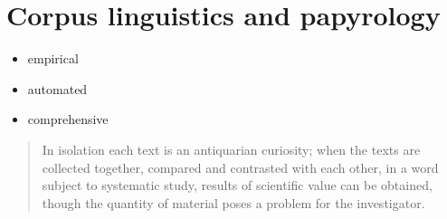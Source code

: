 \chapter{Corpus linguistics and papyrology}
\label{chp:corpuspapyrology}
\minitoc\mtcskip

\begin{itemize}
\item empirical
\item automated
\item comprehensive
\end{itemize}
\begin{quote}
In isolation each text is an antiquarian curiosity; when the texts are
collected together, compared and contrasted with each other, in a word subject
to systematic study, results of scientific value can be obtained, though the
quantity of material poses a problem for the investigator. \citep[129]{turner1980}
\end{quote}


